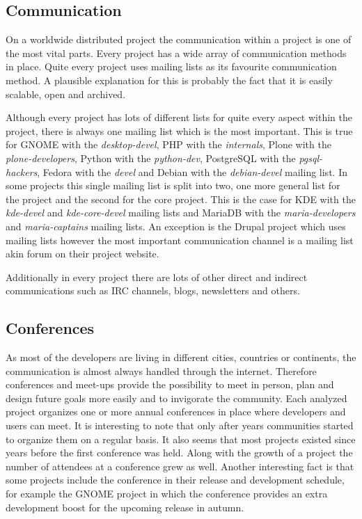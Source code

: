 
\subsection{Communication} %

On a worldwide distributed project the communication within a project is one of
the most vital parts. Every project has a wide array of communication methods
in place. Quite every project uses mailing lists as its favourite communication
method. A plausible explanation for this is probably the fact that it is easily
scalable, open and archived.

Although every project has lots of different lists for quite every aspect
within the project, there is always one mailing list which is the most
important. This is true for GNOME with the \emph{desktop-devel}, PHP with the
\emph{internals}, Plone with the \emph{plone-developers}, Python with the
\emph{python-dev}, PostgreSQL with the \emph{pgsql-hackers}, Fedora with the
\emph{devel} and Debian with the \emph{debian-devel} mailing list. In some
projects this single mailing list is split into two, one more general list for
the project and the second for the core project. This is the case for KDE with
the \emph{kde-devel} and \emph{kde-core-devel} mailing lists and MariaDB with
the \emph{maria-developers} and \emph{maria-captains} mailing lists. An
exception is the Drupal project which uses mailing lists however the most
important communication channel is a mailing list akin forum on their project
website.

Additionally in every project there are lots of other direct and indirect
communications such as \ac{IRC} channels, blogs, newsletters and others.


\subsection{Conferences} %

As most of the developers are living in different cities, countries or
continents, the communication is almost always handled through the internet.
Therefore conferences and meet-ups provide the possibility to meet in person,
plan and design future goals more easily and to invigorate the community. Each
analyzed project organizes one or more annual conferences in place where
developers and users can meet. It is interesting to note that only after years
communities started to organize them on a regular basis. It also seems that
most projects existed since years before the first conference was held. Along
with the growth of a project the number of attendees at a conference grew as
well. Another interesting fact is that some projects include the conference in
their release and development schedule, for example the GNOME project in which
the conference provides an extra development boost for the upcoming release in
autumn.

